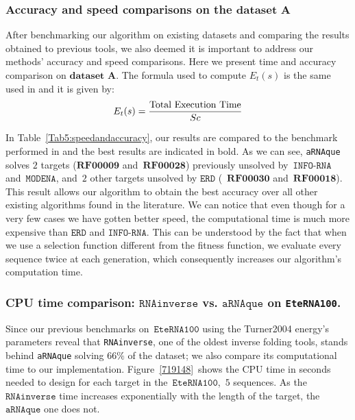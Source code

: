 \subsubsection{Accuracy and speed comparisons on the \(\textbf{dataset A}\)}
{\label{114736}}

After benchmarking our algorithm on existing datasets and comparing the results obtained to previous tools, we also deemed it is important to address our methods' accuracy and speed comparisons. Here we present time and accuracy comparison on \(\textbf{dataset A}\). The formula used to compute \(E_{t}(s)\) is the same used in \cite{esmaili2015erd} and it is given by:
\begin{equation} 
E_{t}(s)=\frac{\text{Total Execution Time}}{Sc}\nonumber \\
\end{equation}

In Table~{\ref{Tab5:speedandaccuracy}}, our results are compared to the benchmark performed in \cite{esmaili2015erd} and the best results are indicated in bold. As we can see, \texttt{aRNAque} solves \(2\) targets (\(\textbf{RF00009}\) and~\(\textbf{RF00028}\)) previously unsolved by~\(\texttt{INFO-RNA}\) and~\(\texttt{MODENA}\), and~\(2\) other targets unsolved by \(\texttt{ERD}\) (~\(\textbf{RF00030}\)
and~\(\textbf{RF00018}\)). This result allows our algorithm to obtain the best accuracy over all other existing algorithms found in the literature. We can notice that even though for a very few cases we have gotten better speed, the computational time is much more expensive than \(\texttt{ERD}\) and \(\texttt{INFO-RNA}\). This can be understood by the fact that when we use a selection function different from the fitness function, we evaluate every sequence twice at each generation, which consequently increases our algorithm's computation time.

\subsubsection{CPU time comparison: \(\texttt{RNAinverse}\) vs.
	\(\texttt{aRNAque}\) on \texttt{EteRNA100}. } 

{\label{391327}}

Since our previous benchmarks on~\(\texttt{EteRNA100}\) using the Turner2004 energy's parameters reveal that \texttt{RNAinverse}, one of the oldest inverse folding tools, stands behind \texttt{aRNAque} solving $66\%$ of the dataset; we also compare its computational time to our implementation.
Figure~{\ref{719148}}~shows the CPU time in seconds needed to design for each target in the~\(\texttt{EteRNA100}\),~\(5\) sequences. As the \(\texttt{RNAinverse}\) time increases exponentially with the length of the target, the \(\texttt{aRNAque}\) one does not. 


